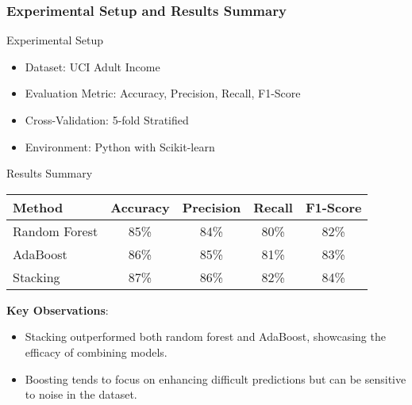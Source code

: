 \documentclass[aspectratio=169]{beamer}
\begin{document}
\begin{frame}
    \frametitle{Experimental Setup and Results Summary}
    
    \begin{block}{Experimental Setup}
        \begin{itemize}
            \item Dataset: UCI Adult Income
            \item Evaluation Metric: Accuracy, Precision, Recall, F1-Score
            \item Cross-Validation: 5-fold Stratified
            \item Environment: Python with Scikit-learn
        \end{itemize}
    \end{block}
    
    \begin{block}{Results Summary}
        \begin{table}[h]
            \begin{tabular}{|l|c|c|c|c|}
                \hline
                Method & Accuracy & Precision & Recall & F1-Score \\
                \hline
                Random Forest & 85\% & 84\% & 80\% & 82\% \\
                AdaBoost & 86\% & 85\% & 81\% & 83\% \\
                Stacking & 87\% & 86\% & 82\% & 84\% \\
                \hline
            \end{tabular}
        \end{table}
        
        \textbf{Key Observations}:
        \begin{itemize}
            \item Stacking outperformed both random forest and AdaBoost, showcasing the efficacy of combining models.
            \item Boosting tends to focus on enhancing difficult predictions but can be sensitive to noise in the dataset.
        \end{itemize}
    \end{block}
\end{frame}
\end{document}
